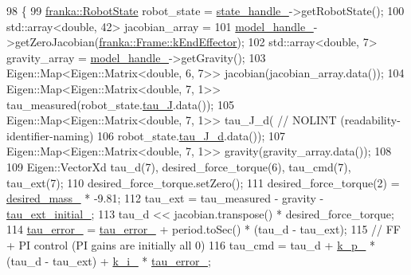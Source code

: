 \begin{DoxyCode}
98                                                                                \{
99   \hyperlink{structfranka_1_1RobotState}{franka::RobotState} robot\_state = \hyperlink{classfranka__example__controllers_1_1ForceExampleController_a4b932a6c22504e9728c57b5fa7ccd620}{state\_handle\_}->getRobotState();
100   std::array<double, 42> jacobian\_array =
101       \hyperlink{classfranka__example__controllers_1_1ForceExampleController_a97bc82b7bea28c31389b857f25adbe47}{model\_handle\_}->getZeroJacobian(\hyperlink{namespacefranka_a00b729ddce916481d3f0d10febec4f5ba3617dcc7555dbca3c3e86e7535914fdf}{franka::Frame::kEndEffector});
102   std::array<double, 7> gravity\_array = \hyperlink{classfranka__example__controllers_1_1ForceExampleController_a97bc82b7bea28c31389b857f25adbe47}{model\_handle\_}->getGravity();
103   Eigen::Map<Eigen::Matrix<double, 6, 7>> jacobian(jacobian\_array.data());
104   Eigen::Map<Eigen::Matrix<double, 7, 1>> tau\_measured(robot\_state.\hyperlink{structfranka_1_1RobotState_ad90e2518d661da0d8fa4c864bae210e5}{tau\_J}.data());
105   Eigen::Map<Eigen::Matrix<double, 7, 1>> tau\_J\_d(  \textcolor{comment}{// NOLINT (readability-identifier-naming)}
106       robot\_state.\hyperlink{structfranka_1_1RobotState_a7086a89a2705810f93a3a95d43df2d9d}{tau\_J\_d}.data());
107   Eigen::Map<Eigen::Matrix<double, 7, 1>> gravity(gravity\_array.data());
108 
109   Eigen::VectorXd tau\_d(7), desired\_force\_torque(6), tau\_cmd(7), tau\_ext(7);
110   desired\_force\_torque.setZero();
111   desired\_force\_torque(2) = \hyperlink{classfranka__example__controllers_1_1ForceExampleController_a5141239dda158063dc67d47aa74c2a3e}{desired\_mass\_} * -9.81;
112   tau\_ext = tau\_measured - gravity - \hyperlink{classfranka__example__controllers_1_1ForceExampleController_a5de4c22bd3d9d27f039f33f0c10fa11f}{tau\_ext\_initial\_};
113   tau\_d << jacobian.transpose() * desired\_force\_torque;
114   \hyperlink{classfranka__example__controllers_1_1ForceExampleController_a2e250641c7304512f8a30be65f276f63}{tau\_error\_} = \hyperlink{classfranka__example__controllers_1_1ForceExampleController_a2e250641c7304512f8a30be65f276f63}{tau\_error\_} + period.toSec() * (tau\_d - tau\_ext);
115   \textcolor{comment}{// FF + PI control (PI gains are initially all 0)}
116   tau\_cmd = tau\_d + \hyperlink{classfranka__example__controllers_1_1ForceExampleController_a2f3c9fae22264a5a80da0d00e617bdf1}{k\_p\_} * (tau\_d - tau\_ext) + \hyperlink{classfranka__example__controllers_1_1ForceExampleController_a1a120dff4babea15e1d5a866547cd13a}{k\_i\_} * \hyperlink{classfranka__example__controllers_1_1ForceExampleController_a2e250641c7304512f8a30be65f276f63}{tau\_error\_};

\end{DoxyCode}
